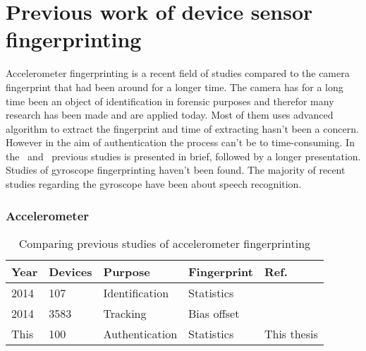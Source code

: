 \section{Previous work of device sensor fingerprinting}
Accelerometer fingerprinting is a recent field of studies compared to the camera fingerprint that had been around for a longer time. The camera has for a long time been an object of identification in forensic purposes and therefor many research has been made and are applied today. Most of them uses advanced algorithm to extract the fingerprint and time of extracting hasn't been a concern. However in the aim of authentication the process can't be to time-consuming. In the~ and~ previous studies is presented in brief, followed by a longer presentation. Studies of gyroscope fingerprinting haven't been found. The majority of recent studies regarding the gyroscope have been about speech recognition. \cite{sensor:speechGyro} 
\begin{table}[H]
\subsubsection*{Accelerometer}
\centering
\begin{tabular}{| p{1cm} | p{1cm} | p{2.5cm} | p{1.8cm} | p{3.5cm} |}
  Year & Devices & Purpose & Fingerprint & Ref. \\ \hline
  2014 & 107 & Identification & Statistics &~\cite{sensor:accelPrint} \\
  2014 & 3583 & Tracking & Bias offset &~\cite{sensor:micSpeak} \\
  This & 100 & Authentication & Statistics & This thesis \\ \hline
\end{tabular} 
\caption[Table caption text]{Comparing previous studies of accelerometer fingerprinting} \label{table:prevAcc}
\end{table}

